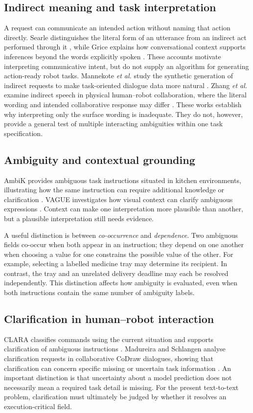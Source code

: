 \documentclass[10pt,conference]{IEEEtran}
\begin{document}
\subsection{Indirect meaning and task interpretation}
A request can communicate an intended action without naming that action directly. Searle distinguishes the literal form of an utterance from an indirect act performed through it \cite{searle1975}, while Grice explains how conversational context supports inferences beyond the words explicitly spoken \cite{grice1975}. These accounts motivate interpreting communicative intent, but do not supply an algorithm for generating action-ready robot tasks. Mannekote \emph{et al.} study the synthetic generation of indirect requests to make task-oriented dialogue data more natural \cite{mannekote}. Zhang \emph{et al.} examine indirect speech in physical human--robot collaboration, where the literal wording and intended collaborative response may differ \cite{tool}. These works establish why interpreting only the surface wording is inadequate. They do not, however, provide a general test of multiple interacting ambiguities within one task specification.

\subsection{Ambiguity and contextual grounding}
AmbiK provides ambiguous task instructions situated in kitchen environments, illustrating how the same instruction can require additional knowledge or clarification \cite{ambik}. VAGUE investigates how visual context can clarify ambiguous expressions \cite{vague}. Context can make one interpretation more plausible than another, but a plausible interpretation still needs evidence.

A useful distinction is between \emph{co-occurrence} and \emph{dependence}. Two ambiguous fields co-occur when both appear in an instruction; they depend on one another when choosing a value for one constrains the possible value of the other. For example, selecting a labelled medicine tray may determine its recipient. In contrast, the tray and an unrelated delivery deadline may each be resolved independently. This distinction affects how ambiguity is evaluated, even when both instructions contain the same number of ambiguity labels.

\subsection{Clarification in human--robot interaction}
CLARA classifies commands using the current situation and supports clarification of ambiguous instructions \cite{clara}. Madureira and Schlangen analyse clarification requests in collaborative CoDraw dialogues, showing that clarification can concern specific missing or uncertain task information \cite{codraw}. An important distinction is that uncertainty about a model prediction does not necessarily mean a required task detail is missing. For the present text-to-text problem, clarification must ultimately be judged by whether it resolves an execution-critical field.
\end{document}
